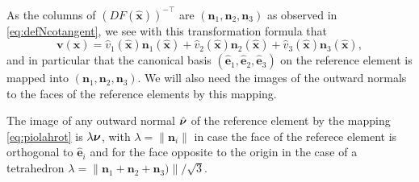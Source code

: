 As the columns of  $(DF(\hat{\mathbf{x}}))^{-\top} $ are $( \mathbf{n}_1, \mathbf{n}_2, \mathbf{n}_3)$ as observed in \eqref{eq:defNcotangent}, we see with this transformation formula that
\begin{equation}\label{eq:expr_contravariant}
 \mathbf{v}( \mathbf{x}) =  \hat{v}_1 (\hat{\mathbf{x}}) \mathbf{n}_1(\hat{\mathbf{x}}) + 
 \hat{v}_2 (\hat{\mathbf{x}}) \mathbf{n}_2(\hat{\mathbf{x}}) + \hat{v}_3 (\hat{\mathbf{x}}) \mathbf{n}_3(\hat{\mathbf{x}}),
\end{equation}
 and in particular that the canonical basis $( \hat{\mathbf{e}}_1, \hat{\mathbf{e}}_2, \hat{\mathbf{e}}_3)$ on the reference element is mapped into $( \mathbf{n}_1, \mathbf{n}_2, \mathbf{n}_3)$.
We will also need the images of the outward normals to the faces of the reference elements by this mapping.
\begin{lemma}\label{lemma:unit_normal}
The image of any outward normal $ \hat{\boldsymbol{\nu}}$ of the reference element by the mapping \eqref{eq:piolahrot} is $\lambda\boldsymbol{\nu}$, with $\lambda=\| \mathbf{n}_i\|$ in case the face of the referece  element is orthogonal to $ \hat{\mathbf{e}}_i$
and for the face opposite to the origin in the case of a tetrahedron $\lambda = \| \mathbf{n}_1 + \mathbf{n}_2 +\mathbf{n}_3)\|/\sqrt{3}$.
\end{lemma}

